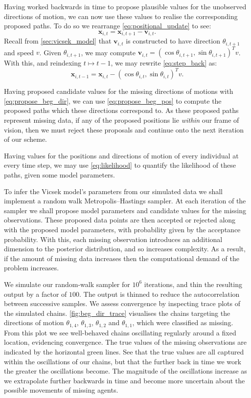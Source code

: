 Having worked backwards in time to propose plausible values for the unobserved
directions of motion, we can now use these values to realise the corresponding
proposed paths. To do so we rearrange \cref{eq:positional_update} to see:
\begin{equation}
  \label{eq:step_back}
  \bm{x}_{i,t} = \bm{x}_{i,t+1} - \bm{v}_{i,t}.
\end{equation}
Recall from \cref{sec:vicsek_model} that $\bm{v}_{i,t}$ is constructed to have
direction $\theta_{i,t+1}$ and speed $v$. Given $\theta_{i,t+1}$, we may
compute $\bm{v}_{i,t} = (\cos\theta_{i,t+1}, \sin\theta_{i,t+1})^Tv$. With
this, and reindexing $t\mapsto t-1$, we may rewrite \cref{eq:step_back} as:
\begin{equation}
  \label{eq:propose_beg_pos}
  \bm{x}_{i,t-1} = \bm{x}_{i,t} - (\cos\theta_{i,t}, \sin\theta_{i,t})^Tv.
\end{equation}

Having proposed candidate values for the missing directions of motions with
\cref{eq:propose_beg_dir}, we can use \cref{eq:propose_beg_pos} to compute the
proposed paths which these directions correspond to. As these proposed
paths represent missing data, if any of the proposed positions lie
\emph{within} our frame of vision, then we must reject these proposals and
continue onto the next iteration of our scheme.

Having values for the positions and directions of motion of every individual at
every time step, we may use \cref{eq:likelihood} to quantify the likelihood of
these paths, given some model parameters.

To infer the Vicsek model's parameters from our simulated data we shall
implement a random walk Metropolis--Hastings sampler. At each iteration of the
sampler we shall propose model parameters and candidate values for the missing
observations. These proposed data points are then accepted or rejected along
with the proposed model parameters, with probability given by the acceptance
probability. With this, each missing observation introduces an additional
dimension to the posterior distribution, and so increases complexity. As a
result, if the amount of missing data increases then the computational demand
of the problem increases.

We simulate our random-walk sampler for $10^6$ iterations, and thin the
resulting output by a factor of $100$. The output is thinned to reduce the
autocorrelation between successive samples. We assess convergence by inspecting
trace plots of the simulated chains. \cref{fig:beg_dir_trace} visualises the
chains targeting the directions of motion $\theta_{1,4}$, $\theta_{1,3}$,
$\theta_{1,2}$ and $\theta_{1,1}$, which were classified as missing. From this
plot we see well-behaved chains oscillating regularly around a fixed location,
evidencing convergence. The true values of the missing observations are
indicated by the horizontal green lines. See that the true values are all
captured within the oscillations of our chains, but that the further back in
time we work the greater the oscillations become. The magnitude of the
oscillations increase as we extrapolate further backwards in time and become
more uncertain about the possible movements of missing agents.

